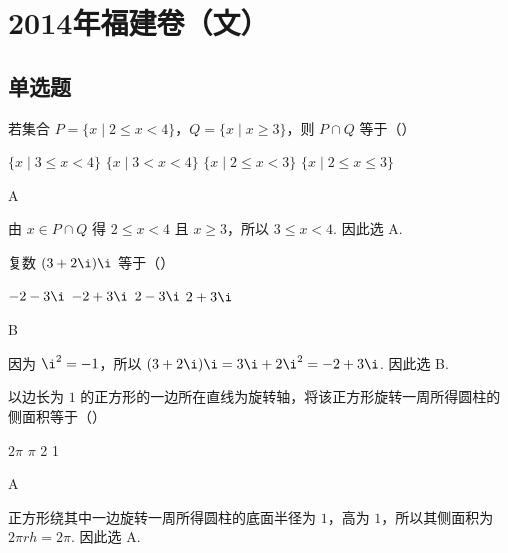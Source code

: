 
\chapter{2014年福建卷（文）}

\section{单选题}

\begin{problem}
若集合 \(P = \{x \mid 2 \leqslant x < 4\}\)，\(Q = \{x \mid x \geqslant 3\}\)，则 \(P \cap Q\) 等于（\quad）

\choices
    {\(\{x \mid 3 \leqslant x < 4\}\)}
    {\(\{x \mid 3 < x < 4\}\)}
    {\(\{x \mid 2 \leqslant x < 3\}\)}
    {\(\{x \mid 2 \leqslant x \leqslant 3\}\)}

\begin{answer}
A
\end{answer}

\begin{solution}
由 \(x\in P\cap Q\) 得 \(2\leqslant x<4\) 且 \(x\geqslant 3\)，所以 \(3\leqslant x<4\). 因此选 A.
\end{solution}
\end{problem}

\begin{problem}
复数 \((3 + 2\i)\i\) 等于（\quad）

\choices
    {\(-2 - 3\i\)}
    {\(-2 + 3\i\)}
    {\(2 - 3\i\)}
    {\(2 + 3\i\)}

\begin{answer}
B
\end{answer}

\begin{solution}
因为 \(\i^2=-1\)，所以 \((3+2\i)\i=3\i+2\i^2=-2+3\i\). 因此选 B.
\end{solution}
\end{problem}

\begin{problem}
以边长为 \(1\) 的正方形的一边所在直线为旋转轴，将该正方形旋转一周所得圆柱的侧面积等于（\quad）

\choices
    {\(2\pi\)}
    {\(\pi\)}
    {2}
    {1}

\begin{answer}
A
\end{answer}

\begin{solution}
正方形绕其中一边旋转一周所得圆柱的底面半径为 \(1\)，高为 \(1\)，所以其侧面积为 \(2\pi rh=2\pi\). 因此选 A.
\end{solution}
\end{problem}

